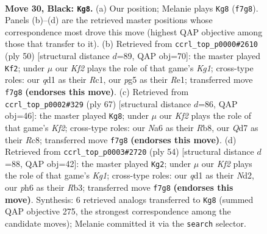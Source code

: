 \documentclass[11pt]{article}
\begin{document}
\clearpage

\begin{figure}[p]\centering
\begin{subfigure}{0.46\textwidth}\centering
\resizebox{\linewidth}{!}{%
\newchessgame
\chessboard[
  setfen={7r/pbrqbk1p/n5pP/1p1p1pP1/3P1P2/1P2P1N1/8/R2QKBNR b KQ - 7 30},
  showmover=false,
  pgfstyle=straightmove, color=movearrow, markmove={f7-g8}
]}
\caption{}
\end{subfigure}\hfill
\begin{subfigure}{0.46\textwidth}\centering
\resizebox{\linewidth}{!}{%
\newchessgame
\chessboard[
  setfen={r5k1/3qrpp1/bp1p1n1p/p2p4/3P4/PP3PP1/3BP2P/2RQRBK1 w - - 6 26},
  showmover=false,
  pgfstyle=straightmove, color=movearrow, markmove={g1-f2}
]}
\caption{}
\end{subfigure}
\\[4pt]
\begin{subfigure}{0.46\textwidth}\centering
\resizebox{\linewidth}{!}{%
\newchessgame
\chessboard[
  setfen={1rr5/2q2knp/2b3p1/p2pPpP1/2pP1P1P/P1Q5/2B1NK2/1R3R2 b - - 13 34},
  showmover=false,
  pgfstyle=straightmove, color=movearrow, markmove={f7-g8}
]}
\caption{}
\end{subfigure}\hfill
\begin{subfigure}{0.46\textwidth}\centering
\resizebox{\linewidth}{!}{%
\newchessgame
\chessboard[
  setfen={r4bk1/5p2/qp1p1np1/1b1Pp2p/rP2P3/1R2BBPP/2QN1P2/2R3K1 w - - 6 28},
  showmover=false,
  pgfstyle=straightmove, color=movearrow, markmove={g1-g2}
]}
\caption{}
\end{subfigure}
\caption{\textbf{Move 30, Black: \texttt{Kg8}.} (a) Our position; Melanie plays \texttt{Kg8} (\texttt{f7g8}). Panels (b)--(d) are the retrieved master positions whose correspondence most drove this move (highest QAP objective among those that transfer to it). (b) Retrieved from \texttt{ccrl\_top\_p0000\#2610} (ply 50) [structural distance $d$=89, QAP obj=70]: the master played \texttt{Kf2}; under $\mu$ our \emph{Kf2} plays the role of that game's \emph{Kg1}; cross-type roles: our \emph{q}d1 as their \emph{R}c1, our \emph{p}g5 as their \emph{R}e1; transferred move \texttt{f7g8} \textbf{(endorses this move)}. (c) Retrieved from \texttt{ccrl\_top\_p0002\#329} (ply 67) [structural distance $d$=86, QAP obj=46]: the master played \texttt{Kg8}; under $\mu$ our \emph{Kf2} plays the role of that game's \emph{Kf2}; cross-type roles: our \emph{N}a6 as their \emph{R}b8, our \emph{Q}d7 as their \emph{R}c8; transferred move \texttt{f7g8} \textbf{(endorses this move)}. (d) Retrieved from \texttt{ccrl\_top\_p0003\#2720} (ply 54) [structural distance $d$=88, QAP obj=42]: the master played \texttt{Kg2}; under $\mu$ our \emph{Kf2} plays the role of that game's \emph{Kg1}; cross-type roles: our \emph{q}d1 as their \emph{N}d2, our \emph{p}h6 as their \emph{R}b3; transferred move \texttt{f7g8} \textbf{(endorses this move)}. Synthesis: 6 retrieved analogs transferred to \texttt{Kg8} (summed QAP objective 275, the strongest correspondence among the candidate moves); Melanie committed it via the \texttt{search} selector.}
\label{fig:thought-m59}
\end{figure}
\end{document}
